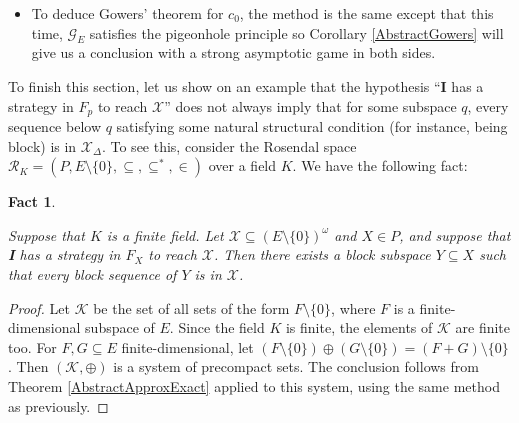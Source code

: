 \documentclass[a4paper,11pt]{article}
\newtheorem{fact}[thm]{Fact}
\theoremstyle{definition}
\numberwithin{equation}{section}
\newcommand{\Ros}{\mathcal{R}}
\newcommand{\X}{\mathcal{X}}
\newcommand{\G}{\mathcal{G}}
\newcommand{\I}{\textbf{I}}
\newcommand{\II}{\textbf{II}}
\newcommand{\K}{\mathcal{K}}
\begin{document}
\begin{itemize}
\item To deduce Gowers' theorem for $c_0$, the method is the same except that this time, $\G_E$ satisfies the pigeonhole principle so Corollary \ref{AbstractGowers} will give us a conclusion with a strong asymptotic game in both sides.

\end{itemize}


To finish this section, let us show on an example that the hypothesis ``\I{} has a strategy in $F_p$ to reach $\X$'' does not always imply that for some subspace $q$, every sequence below $q$ satisfying some natural structural condition (for instance, being block) is in $\X_\Delta$. To see this, consider the Rosendal space $\Ros_K = (P, E \setminus \{0\}, \subseteq, \subseteq^*, \in)$ over a field $K$. We have the following fact:

\begin{fact}\label{Fact66}

Suppose that $K$ is a finite field. Let $\X \subseteq (E \setminus \{0\})^\omega$ and $X \in P$, and suppose that \I{} has a strategy in $F_X$ to reach $\X$. Then there exists a block subspace $Y \subseteq X$ such that every block sequence of $Y$ is in $\X$.

\end{fact}

\begin{proof}

Let $\K$ be the set of all sets of the form $F \setminus \{0\}$, where $F$ is a finite-dimensional subspace of $E$. Since the field $K$ is finite, the elements of $\K$ are finite too. For $F, G \subseteq E$ finite-dimensional, let $(F \setminus \{0\}) \oplus (G \setminus \{0\}) = (F + G) \setminus \{0\}$. Then $(\K, \oplus)$ is a system of precompact sets. The conclusion follows from Theorem \ref{AbstractApproxExact} applied to this system, using the same method as previously.


\end{proof}
\end{document}
